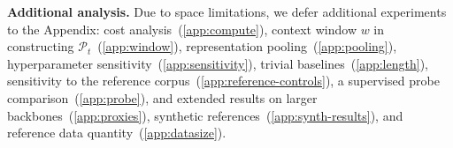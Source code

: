 

\textbf{Additional analysis.} Due to space limitations, we defer additional experiments to the Appendix: cost analysis~(\ref{app:compute}), context window $w$ in constructing $\mathcal{P}_t$~(\ref{app:window}), representation pooling~(\ref{app:pooling}), hyperparameter sensitivity~(\ref{app:sensitivity}), trivial baselines~(\ref{app:length}), sensitivity to the reference corpus~(\ref{app:reference-controls}), a supervised probe comparison~(\ref{app:probe}), and extended results on larger backbones~(\ref{app:proxies}), synthetic references~(\ref{app:synth-results}), and reference data quantity~(\ref{app:datasize}).

\vspace{-1em}